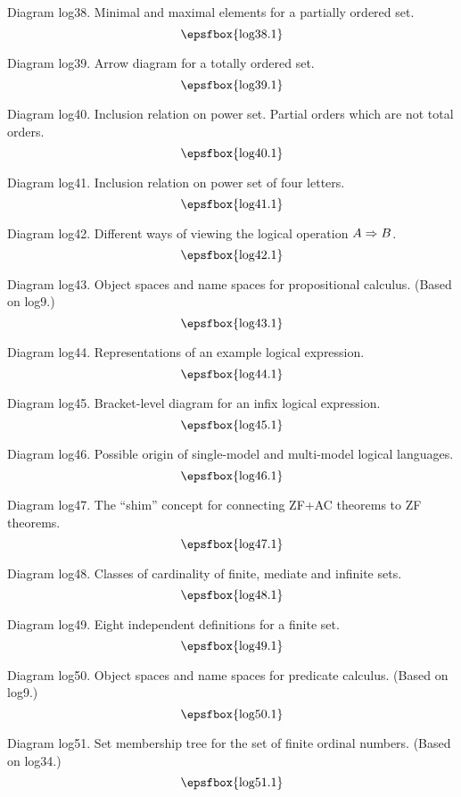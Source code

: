 Diagram log38. Minimal and maximal elements for a partially ordered set.
$$
\centerline{\epsfbox{log38.1}}
$$

Diagram log39. Arrow diagram for a totally ordered set.
$$
\centerline{\epsfbox{log39.1}}
$$

Diagram log40. Inclusion relation on power set. Partial orders which are not
total orders.
$$
\centerline{\epsfbox{log40.1}}
$$

Diagram log41. Inclusion relation on power set of four letters.
$$
\centerline{\epsfbox{log41.1}}
$$

\filleject

Diagram log42. Different ways of viewing the logical operation $A\mathrel{\Rightarrow} B$.
$$
\centerline{\epsfbox{log42.1}}
$$

Diagram log43. Object spaces and name spaces for propositional calculus. (Based
on log9.)
$$
\centerline{\epsfbox{log43.1}}
$$

Diagram log44. Representations of an example logical expression.
$$
\centerline{\epsfbox{log44.1}}
$$

\filleject

Diagram log45. Bracket-level diagram for an infix logical expression.
$$
\centerline{\epsfbox{log45.1}}
$$

Diagram log46. Possible origin of single-model and multi-model logical
languages.
$$
\centerline{\epsfbox{log46.1}}
$$

Diagram log47. The ``shim'' concept for connecting ZF+AC theorems to ZF
theorems.
$$
\centerline{\epsfbox{log47.1}}
$$

Diagram log48. Classes of cardinality of finite, mediate and infinite sets.
$$
\centerline{\epsfbox{log48.1}}
$$

\filleject

Diagram log49. Eight independent definitions for a finite set.
$$
\centerline{\epsfbox{log49.1}}
$$

Diagram log50. Object spaces and name spaces for predicate calculus. (Based on
log9.)
$$
\centerline{\epsfbox{log50.1}}
$$

Diagram log51. Set membership tree for the set of finite ordinal numbers. (Based
on log34.)
$$
\centerline{\epsfbox{log51.1}}
$$

\filleject

